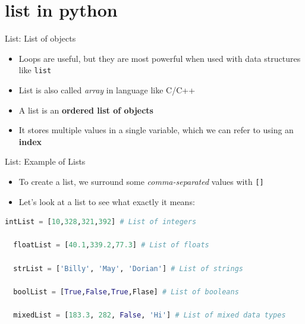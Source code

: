 \documentclass[10pt,xcolor={table,dvipsnames},t]{beamer}
\begin{document}


\section{list in python}
\begin{frame}{List: List of objects}
  \begin{itemize}
    \item Loops are useful, but they are most powerful when used with data structures like \texttt{list}
    \item List is also called \textit{array} in language like C/C++
    \item A list is an \textbf{ordered list of objects}
    \item It stores multiple values in a single variable, which we can refer to using an \textbf{index}
  \end{itemize}
\end{frame}

\begin{frame}[fragile]{List: Example of Lists}
  \begin{itemize}
    \item To create a list, we surround some \textit{comma-separated} values with \texttt{[]}
    \item Let's look at a list to see what exactly it means:
  \end{itemize}
\begin{lstlisting}[language=python]
  intList = [10,328,321,392] # List of integers

  floatList = [40.1,339.2,77.3] # List of floats

  strList = ['Billy', 'May', 'Dorian'] # List of strings

  boolList = [True,False,True,Flase] # List of booleans

  mixedList = [183.3, 282, False, 'Hi'] # List of mixed data types
\end{lstlisting}
\end{frame}
\end{document}
